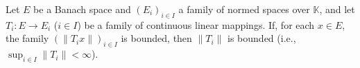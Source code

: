 Let $E$ be a Banach space and $(E_i)_{i \in I}$ a family of normed spaces over $\mathbb{K}$, and let $T_i : E \to E_i$ ($i \in I$) be a family of continuous linear mappings. If, for each $x \in E$, the family $(\|T_i x\|)_{i \in I}$ is bounded, then $\|T_i\|$ is bounded (i.e., $\sup_{i \in I} \|T_i\| < \infty$).
